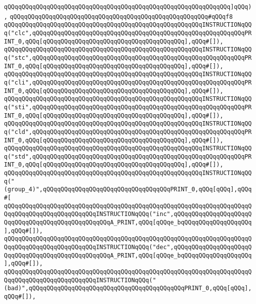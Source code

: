 \verb|qQQqqQQqqQQqqQQqqQQqqQQqqQQqqQQqqQQqqQQqqQQqqQQqqQQqqQQqqQQqqQQq]qQQq),|\newline
\verb|qQQqqQQqqQQqqQQqqQQqqQQqqQQqqQQqqQQqqQQqqQQqqQQqqQQqqQQq#qQQqf8|\newline
\verb|qQQqqQQqqQQqqQQqqQQqqQQqqQQqqQQqqQQqqQQqqQQqqQQqqQQqqQQqINSTRUCTIONqQQq("clc",qQQqqQQqqQQqqQQqqQQqqQQqqQQqqQQqqQQqqQQqqQQqqQQqqQQqqQQqqQQqPRINT_0,qQQq[qQQqqQQqqQQqqQQqqQQqqQQqqQQqqQQqqQQqqQQq],qQQq#[]),|\newline
\verb|qQQqqQQqqQQqqQQqqQQqqQQqqQQqqQQqqQQqqQQqqQQqqQQqqQQqqQQqINSTRUCTIONqQQq("stc",qQQqqQQqqQQqqQQqqQQqqQQqqQQqqQQqqQQqqQQqqQQqqQQqqQQqqQQqqQQqPRINT_0,qQQq[qQQqqQQqqQQqqQQqqQQqqQQqqQQqqQQqqQQqqQQq],qQQq#[]),|\newline
\verb|qQQqqQQqqQQqqQQqqQQqqQQqqQQqqQQqqQQqqQQqqQQqqQQqqQQqqQQqINSTRUCTIONqQQq("cli",qQQqqQQqqQQqqQQqqQQqqQQqqQQqqQQqqQQqqQQqqQQqqQQqqQQqqQQqqQQqPRINT_0,qQQq[qQQqqQQqqQQqqQQqqQQqqQQqqQQqqQQqqQQqqQQq],qQQq#[]),|\newline
\verb|qQQqqQQqqQQqqQQqqQQqqQQqqQQqqQQqqQQqqQQqqQQqqQQqqQQqqQQqINSTRUCTIONqQQq("sti",qQQqqQQqqQQqqQQqqQQqqQQqqQQqqQQqqQQqqQQqqQQqqQQqqQQqqQQqqQQqPRINT_0,qQQq[qQQqqQQqqQQqqQQqqQQqqQQqqQQqqQQqqQQqqQQq],qQQq#[]),|\newline
\verb|qQQqqQQqqQQqqQQqqQQqqQQqqQQqqQQqqQQqqQQqqQQqqQQqqQQqqQQqINSTRUCTIONqQQq("cld",qQQqqQQqqQQqqQQqqQQqqQQqqQQqqQQqqQQqqQQqqQQqqQQqqQQqqQQqqQQqPRINT_0,qQQq[qQQqqQQqqQQqqQQqqQQqqQQqqQQqqQQqqQQqqQQq],qQQq#[]),|\newline
\verb|qQQqqQQqqQQqqQQqqQQqqQQqqQQqqQQqqQQqqQQqqQQqqQQqqQQqqQQqINSTRUCTIONqQQq("std",qQQqqQQqqQQqqQQqqQQqqQQqqQQqqQQqqQQqqQQqqQQqqQQqqQQqqQQqqQQqPRINT_0,qQQq[qQQqqQQqqQQqqQQqqQQqqQQqqQQqqQQqqQQqqQQq],qQQq#[]),|\newline
\verb|qQQqqQQqqQQqqQQqqQQqqQQqqQQqqQQqqQQqqQQqqQQqqQQqqQQqqQQqINSTRUCTIONqQQq("(group_4)",qQQqqQQqqQQqqQQqqQQqqQQqqQQqqQQqqQQqPRINT_0,qQQq[qQQq],qQQq#[|\newline
\verb|qQQqqQQqqQQqqQQqqQQqqQQqqQQqqQQqqQQqqQQqqQQqqQQqqQQqqQQqqQQqqQQqqQQqqQQqqQQqqQQqqQQqqQQqqQQqqQQqINSTRUCTIONqQQq("inc",qQQqqQQqqQQqqQQqqQQqqQQqqQQqqQQqqQQqqQQqqQQqqQQqqQQqA_PRINT,qQQq[qQQqe_bqQQqqQQqqQQqqQQqqQQq],qQQq#[]),|\newline
\verb|qQQqqQQqqQQqqQQqqQQqqQQqqQQqqQQqqQQqqQQqqQQqqQQqqQQqqQQqqQQqqQQqqQQqqQQqqQQqqQQqqQQqqQQqqQQqqQQqINSTRUCTIONqQQq("dec",qQQqqQQqqQQqqQQqqQQqqQQqqQQqqQQqqQQqqQQqqQQqqQQqqQQqA_PRINT,qQQq[qQQqe_bqQQqqQQqqQQqqQQqqQQq],qQQq#[]),|\newline
\verb|qQQqqQQqqQQqqQQqqQQqqQQqqQQqqQQqqQQqqQQqqQQqqQQqqQQqqQQqqQQqqQQqqQQqqQQqqQQqqQQqqQQqqQQqqQQqqQQqINSTRUCTIONqQQq("(bad)",qQQqqQQqqQQqqQQqqQQqqQQqqQQqqQQqqQQqqQQqqQQqPRINT_0,qQQq[qQQq],qQQq#[]),|\newline
